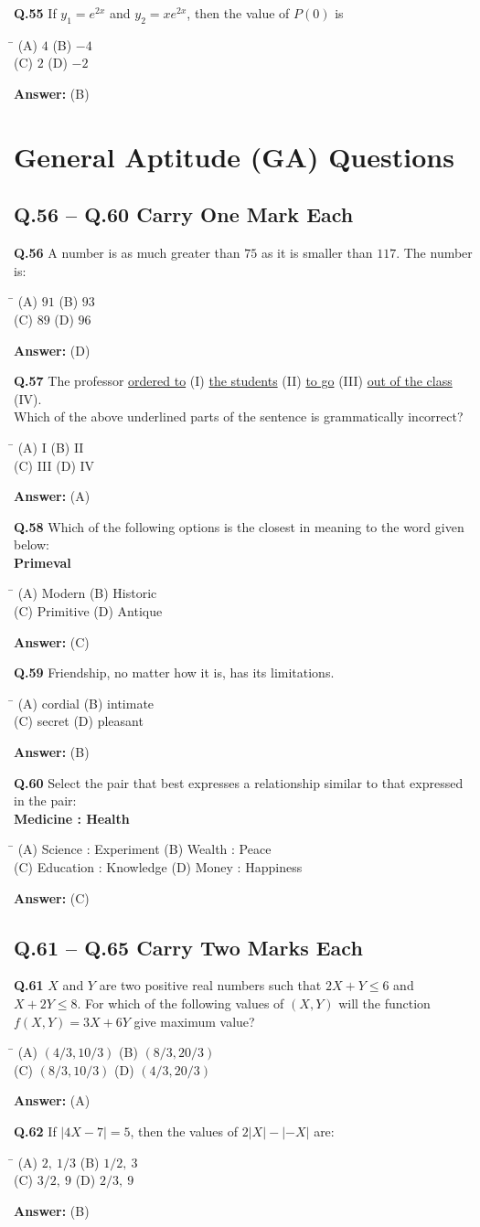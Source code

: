 \documentclass[11pt,a4paper]{article}
\newcommand{\optsfourA}[4]{%
  \begin{tabbing}
    \hspace{0.48\linewidth}\=\kill
    (A) #1 \> (B) #2 \\[2pt]
    (C) #3 \> (D) #4
  \end{tabbing}%
}
\newcommand{\ans}[1]{\textbf{Answer:} #1\par\medskip}
\begin{document}
\textbf{Q.55} If $y_1 = e^{2x}$ and $y_2 = x e^{2x}$, then the value of $P(0)$ is
\optsfourA{$4$}{$-4$}{$2$}{$-2$}
\ans{(B)}

\section*{General Aptitude (GA) Questions}

\subsection*{Q.56 -- Q.60 Carry One Mark Each}

\textbf{Q.56} A number is as much greater than $75$ as it is smaller than $117$. The number is:
\optsfourA{$91$}{$93$}{$89$}{$96$}
\ans{(D)}

\textbf{Q.57} The professor \underline{ordered to} (I) \underline{the students} (II) \underline{to go} (III) \underline{out of the class} (IV).\\
Which of the above underlined parts of the sentence is grammatically incorrect?
\optsfourA{I}{II}{III}{IV}
\ans{(A)}

\textbf{Q.58} Which of the following options is the closest in meaning to the word given below:\\
\textbf{Primeval}
\optsfourA{Modern}{Historic}{Primitive}{Antique}
\ans{(C)}

\textbf{Q.59} Friendship, no matter how \underline{\hspace{2cm}} it is, has its limitations.
\optsfourA{cordial}{intimate}{secret}{pleasant}
\ans{(B)}

\textbf{Q.60} Select the pair that best expresses a relationship similar to that expressed in the pair:\\
\textbf{Medicine : Health}
\optsfourA{Science : Experiment}{Wealth : Peace}{Education : Knowledge}{Money : Happiness}
\ans{(C)}

\subsection*{Q.61 -- Q.65 Carry Two Marks Each}

\textbf{Q.61} $X$ and $Y$ are two positive real numbers such that $2X + Y \le 6$ and $X + 2Y \le 8$. For which of the following values of $(X, Y)$ will the function $f(X, Y) = 3X + 6Y$ give maximum value?
\optsfourA{$(4/3, 10/3)$}{$(8/3, 20/3)$}{$(8/3, 10/3)$}{$(4/3, 20/3)$}
\ans{(A)}

\textbf{Q.62} If $|4X - 7| = 5$, then the values of $2|X| - |-X|$ are:
\optsfourA{$2,\ 1/3$}{$1/2,\ 3$}{$3/2,\ 9$}{$2/3,\ 9$}
\ans{(B)}
\end{document}
